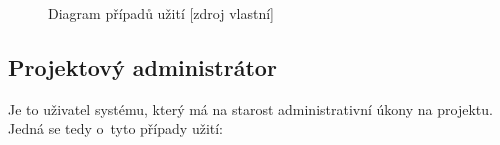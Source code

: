     \begin{figure}[!htbp]
    \begin{center}
    \caption{Diagram případů užití [zdroj vlastní]}
    \label{usecase}
    \end{center}
    \end{figure}
    
\subsection*{Projektový administrátor}

Je to uživatel systému, který má na starost administrativní úkony na projektu. Jedná se tedy o~tyto případy užití: 

